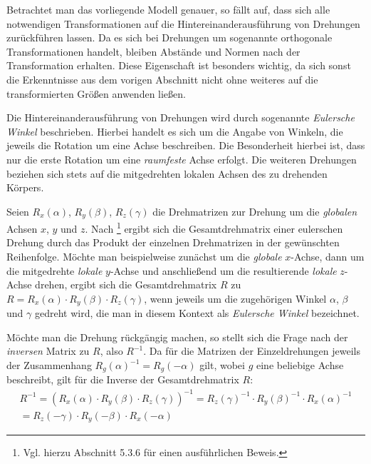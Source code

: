 Betrachtet man das vorliegende Modell genauer, so f\"allt auf, dass sich alle notwendigen Transformationen auf die
Hintereinanderausf\"uhrung von Drehungen zur\"uckf\"uhren lassen. Da es sich bei Drehungen um sogenannte orthogonale Transformationen
handelt, bleiben Abst\"ande und Normen nach der Transformation erhalten. Diese Eigenschaft ist besonders wichtig, da sich sonst
die Erkenntnisse aus dem vorigen Abschnitt nicht ohne weiteres auf die transformierten Gr\"o{\ss}en anwenden lie{\ss}en.

Die Hintereinanderausf\"uhrung von Drehungen wird durch sogenannte \textit{Eulersche Winkel} beschrieben. Hierbei handelt es sich
um die Angabe von Winkeln, die jeweils die Rotation um eine Achse beschreiben. Die Besonderheit hierbei ist, dass nur die erste
Rotation um eine \textit{raumfeste} Achse erfolgt. Die weiteren Drehungen beziehen sich stets auf die mitgedrehten lokalen Achsen des
zu drehenden K\"orpers.

Seien \(R_x(\alpha)\), \(R_y(\beta)\), \(R_z(\gamma)\) die Drehmatrizen zur Drehung um die \textit{globalen} Achsen \(x\), \(y\)
und \(z\). Nach \cite{Fis12}\footnote{Vgl. hierzu Abschnitt 5.3.6 f\"ur einen ausf\"uhrlichen Beweis.} ergibt sich die
Gesamtdrehmatrix einer eulerschen Drehung durch das Produkt der einzelnen Drehmatrizen
in der gew\"unschten Reihenfolge. M\"ochte man beispielweise zun\"achst um die \textit{globale} \(x\)-Achse, dann um die mitgedrehte
\textit{lokale} \(y\)-Achse und anschlie{\ss}end um die resultierende \textit{lokale} \(z\)-Achse drehen, ergibt sich die
Gesamtdrehmatrix \(R\) zu \(R = R_x(\alpha) \cdot R_y(\beta) \cdot R_z(\gamma)\), wenn jeweils um die zugeh\"origen Winkel
\(\alpha\), \(\beta\) und \(\gamma\) gedreht wird, die man in diesem Kontext als \textit{Eulersche Winkel} bezeichnet.

M\"ochte man die Drehung r\"uckg\"angig machen, so stellt sich die Frage nach der \textit{inversen} Matrix zu \(R\), also \(R^{-1}\).
Da f\"ur die Matrizen der Einzeldrehungen jeweils der Zusammenhang \(R_g(\alpha)^{-1} = R_g(-\alpha)\) gilt, wobei \(g\) eine beliebige
Achse beschreibt, gilt f\"ur die Inverse der Gesamtdrehmatrix \(R\):
\begin{equation}
  \label{eq:gesamtdrehung}
  \begin{split}
R^{-1} = \left(R_x(\alpha) \cdot R_y(\beta) \cdot R_z(\gamma)\right)^{-1} = R_z(\gamma)^{-1} \cdot R_y(\beta)^{-1} \cdot
R_x(\alpha)^{-1} \\
= R_z(-\gamma) \cdot R_y(-\beta) \cdot R_x(-\alpha)
  \end{split}
\end{equation}

